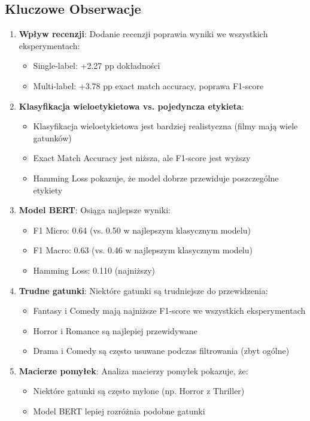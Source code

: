 \documentclass[12pt,a4paper]{article}
\begin{document}
\subsection{Kluczowe Obserwacje}

\begin{enumerate}
    \item \textbf{Wpływ recenzji}: Dodanie recenzji poprawia wyniki we wszystkich eksperymentach:
    \begin{itemize}
        \item Single-label: +2.27 pp dokładności
        \item Multi-label: +3.78 pp exact match accuracy, poprawa F1-score
    \end{itemize}
    
    \item \textbf{Klasyfikacja wieloetykietowa vs. pojedyncza etykieta}: 
    \begin{itemize}
        \item Klasyfikacja wieloetykietowa jest bardziej realistyczna (filmy mają wiele gatunków)
        \item Exact Match Accuracy jest niższa, ale F1-score jest wyższy
        \item Hamming Loss pokazuje, że model dobrze przewiduje poszczególne etykiety
    \end{itemize}
    
    \item \textbf{Model BERT}: Osiąga najlepsze wyniki:
    \begin{itemize}
        \item F1 Micro: 0.64 (vs. 0.50 w najlepszym klasycznym modelu)
        \item F1 Macro: 0.63 (vs. 0.46 w najlepszym klasycznym modelu)
        \item Hamming Loss: 0.110 (najniższy)
    \end{itemize}
    
    \item \textbf{Trudne gatunki}: Niektóre gatunki są trudniejsze do przewidzenia:
    \begin{itemize}
        \item Fantasy i Comedy mają najniższe F1-score we wszystkich eksperymentach
        \item Horror i Romance są najlepiej przewidywane
        \item Drama i Comedy są często usuwane podczas filtrowania (zbyt ogólne)
    \end{itemize}
    
    \item \textbf{Macierze pomyłek}: Analiza macierzy pomyłek pokazuje, że:
    \begin{itemize}
        \item Niektóre gatunki są często mylone (np. Horror z Thriller)
        \item Model BERT lepiej rozróżnia podobne gatunki
    \end{itemize}
\end{enumerate}
\end{document}
